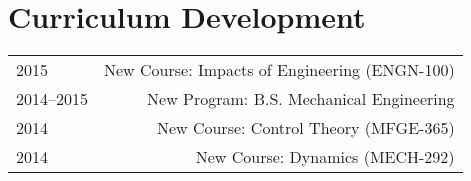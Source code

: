 \section*{Curriculum Development}
\begin{tabular}{L!{\VRule}R}
2015&New Course: Impacts of Engineering (ENGN-100)\\
2014--2015&New Program: B.S. Mechanical Engineering\\
2014&New Course: Control Theory (MFGE-365)\\
2014&New Course: Dynamics (MECH-292)\\
\end{tabular}